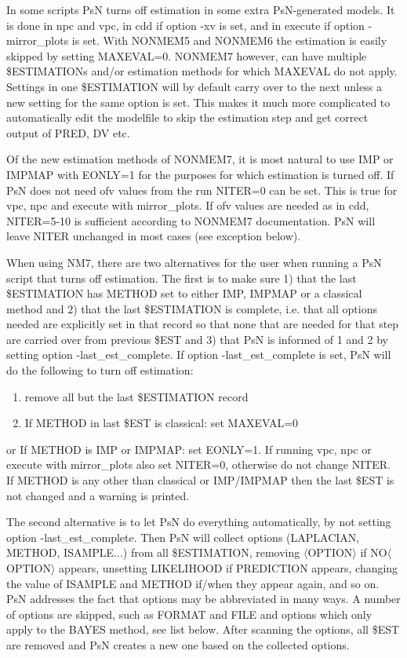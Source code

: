 In some scripts PsN turns off estimation in some extra PsN-generated models. It is done in npc and vpc, in cdd if option -xv is set, and in execute if option -mirror\_plots is set. With NONMEM5 and NONMEM6 the estimation is easily skipped by setting MAXEVAL=0. NONMEM7 however,  can have multiple \$ESTIMATIONs and/or estimation methods for which MAXEVAL do not apply. Settings in one \$ESTIMATION will by default carry over to the next unless a new setting for the same option is set. This makes it much more complicated to automatically edit the modelfile to skip the estimation step and get correct output of PRED, DV etc. 

Of the new estimation methods of NONMEM7, it is most natural to use IMP or IMPMAP with EONLY=1 for the purposes for which estimation is turned off. If PsN does not need ofv values from the run NITER=0 can be set. This is true for vpc, npc and execute with mirror\_plots. If ofv values are needed as in cdd, NITER=5-10 is sufficient according to NONMEM7 documentation. PsN will leave NITER unchanged in most cases (see exception below).

When using NM7, there are two alternatives for the user when running a PsN script that turns off estimation. The first is to make sure 1) that the last \$ESTIMATION has METHOD set to either IMP, IMPMAP or a classical method and 2) that the last \$ESTIMATION is complete, i.e. that all options needed are explicitly set in that record so that none that are needed for that step are carried over from previous \$EST and 3) that PsN is informed of 1 and 2 by setting option -last\_est\_complete. If option -last\_est\_complete is set, PsN will do the following to turn off estimation: 
\begin{enumerate}
	\item remove all but the last \$ESTIMATION record 
	\item If METHOD in last \$EST is classical: set MAXEVAL=0 
\end{enumerate}
or 
If METHOD is IMP or IMPMAP: set EONLY=1. If running vpc, npc or execute with 
mirror\_plots also set NITER=0, otherwise do not change NITER.
If METHOD is any other than classical or IMP/IMPMAP then the last \$EST is not changed and a warning is printed.

The second alternative is to let PsN do everything automatically, by not setting option -last\_est\_complete. Then PsN will collect options (LAPLACIAN, METHOD, ISAMPLE...) from all \$ESTIMATION, removing $\langle$OPTION$\rangle$ if NO$\langle$OPTION$\rangle$ appears, unsetting LIKELIHOOD if PREDICTION appears, changing the value of ISAMPLE and METHOD if/when they appear again, and so on. PsN addresses the fact that options may be abbreviated in many ways. A number of options are skipped, such as FORMAT and FILE and options which only apply to the BAYES method, see list below. After scanning the options, all \$EST are removed and PsN creates a new one based on the collected options. 

